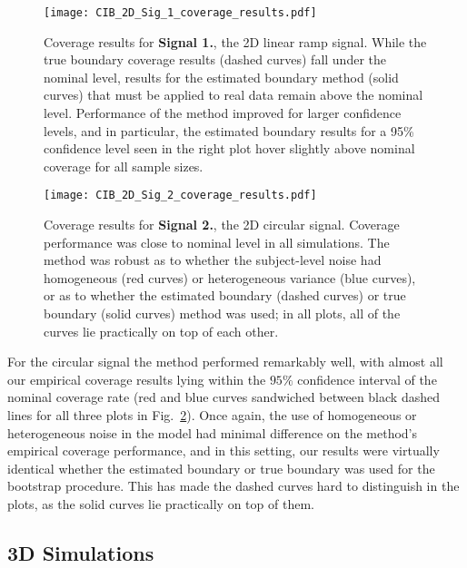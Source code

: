 \begin{figure}[htbp]
\hspace*{-1.5cm}
    \texttt{[image: CIB\_2D\_Sig\_1\_coverage\_results.pdf]}
\caption{Coverage results for \textbf{Signal 1.}, the 2D linear ramp signal. While the true boundary coverage results (dashed curves) fall under the nominal level, results for the estimated boundary method (solid curves) that must be applied to real data remain above the nominal level. Performance of the method improved for larger confidence levels, and in particular, the estimated boundary results for a 95\% confidence level seen in the right plot hover slightly above nominal coverage for all sample sizes.}
\label{fig:2D_sig_1_results}
\end{figure}

\clearpage

\begin{figure}[htbp]
\hspace*{-1.5cm}
    \texttt{[image: CIB\_2D\_Sig\_2\_coverage\_results.pdf]}
\caption{Coverage results for \textbf{Signal 2.}, the 2D circular signal. Coverage performance was close to nominal level in all simulations. The method was robust as to whether the subject-level noise had homogeneous (red curves) or heterogeneous variance (blue curves), or as to whether the estimated boundary (dashed curves) or true boundary (solid curves) method was used; in all plots, all of the curves lie practically on top of each other.}
\label{fig:2D_sig_2_results}
\end{figure}


For the circular signal the method performed remarkably well, with almost all our empirical coverage results lying within the $95\%$ confidence interval of the nominal coverage rate (red and blue curves sandwiched between black dashed lines for all three plots in Fig.\ \ref{fig:2D_sig_2_results}). Once again, the use of homogeneous or heterogeneous noise in the model had minimal difference on the method's empirical coverage performance, and in this setting, our results were virtually identical whether the estimated boundary or true boundary was used for the bootstrap procedure. This has made the dashed curves hard to distinguish in the plots, as the solid curves lie practically on top of them. 

\clearpage

\subsection{3D Simulations}
\label{sec:3D_simulation_results}

